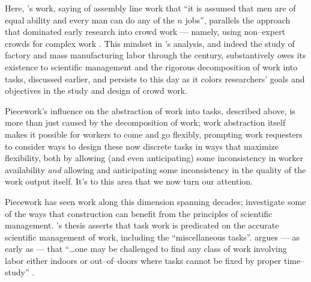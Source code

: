 \documentclass[trackingWork]{subfiles}
\begin{document}
Here, \citeauthor{hu1961parallel}'s work,
saying of assembly line work that
``it is assumed that men are of equal ability and every man can do any of the $n$ jobs'',
parallels the approach that dominated early research into crowd work
--- namely, using non--expert crowds for complex work
\cite{hu1961parallel}.
This mindset in \citeauthor{hu1961parallel}'s analysis,
and indeed the study of factory and mass manufacturing labor through the  century,
substantively owes its existence to scientific management
and the rigorous decomposition of work into tasks, discussed earlier,
and persists to this day as it colors
researchers' goals and objectives in the study and design of crowd work.

Piecework's influence on the abstraction of work into tasks,
described above, is more than just caused by the decomposition of work;
work abstraction itself makes it possible for workers to come and go flexibly,
prompting work requesters to consider ways to design these now discrete tasks in ways that
maximize flexibility, both by allowing (and even anticipating) some inconsistency in worker availability
\textit{and} allowing and anticipating some inconsistency in the quality of the work output itself.
It's to this area that we now turn our attention.






















Piecework has seen work along this dimension spanning decades;
\citeauthor{thompson1913time} investigate some of the ways that
construction can benefit from the principles of scientific management.
\citeauthor{thompson1913time}'s thesis asserts that
task work is predicated on the accurate scientific management of work,
including the ``miscellaneous tasks''.
\citeauthor{thompson1913time} argues
--- as early as \citeyear{thompson1913time} ---
that ``\dots one may be challenged to find any class of work
involving labor either indoors or out--of--doors
where tasks cannot be fixed by proper time--study''
\cite{thompson1913time}.
\end{document}
